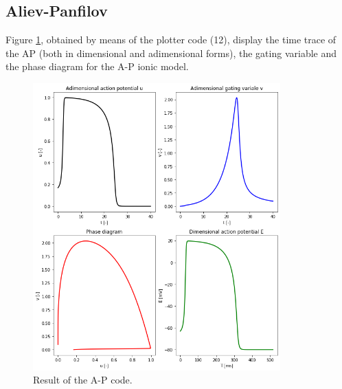 \documentclass[11pt,a4paper]{article}
\begin{document}
\subsection{Aliev-Panfilov}\label{sec:results_ap}

Figure \ref{fig:ap}, obtained by means of the plotter code (12), display the time trace of the AP (both in dimensional and adimensional forms), the gating variable and the phase diagram for the A-P ionic model.  

\begin{figure}[t]
	\centering
	\includegraphics[width=0.85\textwidth]{./Images/A-P.png}
	\caption{Result of the A-P code.}
	\label{fig:ap}
\end{figure} 
\end{document}
